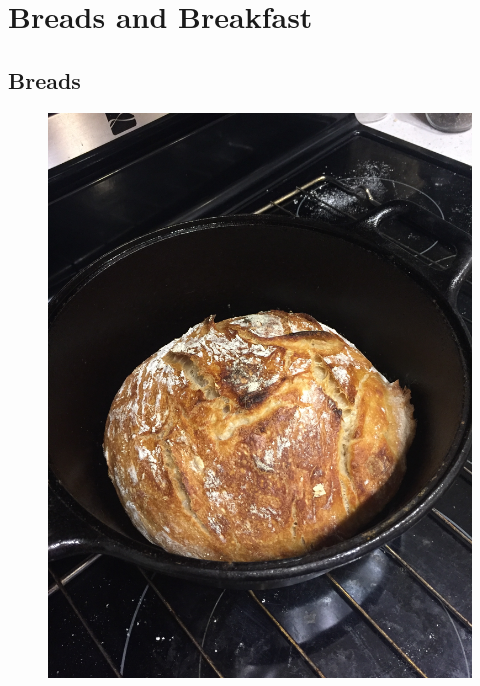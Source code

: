\documentclass[11pt]{report}
\begin{document}
\pagestyle{fancy}

\tableofcontents


\part{Breads and Breakfast}
\chapter{Breads}
\begin{figure}[h]
\begin{center}
   \includegraphics[width=0.9\linewidth, angle=270]{images/IMG_6927.JPG}
\end{center}
\end{figure}
\newpage



\end{document}
